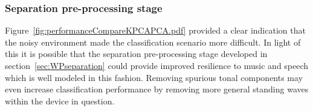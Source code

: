 \subsubsection{Separation pre-processing stage}
Figure~\ref{fig:performanceCompareKPCAPCA.pdf} provided a clear indication that the noisy environment made the classification scenario more difficult. In light of this it is possible that the separation pre-processing stage developed in section~\ref{sec:WPseparation} could provide improved resilience to music and speech which is well modeled in this fashion. Removing spurious tonal components may even increase classification performance by removing more general standing waves within the device in question.


